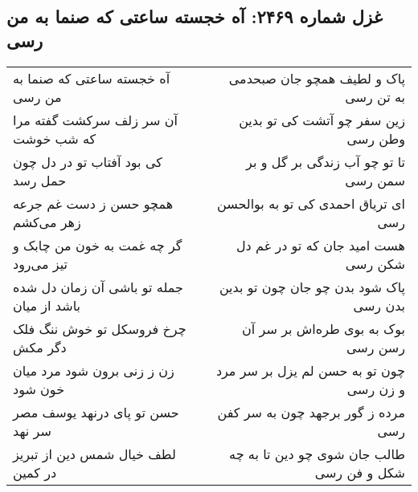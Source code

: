 \begin{center}
\section*{غزل شماره ۲۴۶۹: آه خجسته ساعتی که صنما به من رسی}
\label{sec:2469}
\begin{longtable}{l p{0.5cm} r}
آه خجسته ساعتی که صنما به من رسی
&&
پاک و لطیف همچو جان صبحدمی به تن رسی
\\
آن سر زلف سرکشت گفته مرا که شب خوشت
&&
زین سفر چو آتشت کی تو بدین وطن رسی
\\
کی بود آفتاب تو در دل چون حمل رسد
&&
تا تو چو آب زندگی بر گل و بر سمن رسی
\\
همچو حسن ز دست غم جرعه زهر می‌کشم
&&
ای تریاق احمدی کی تو به بوالحسن رسی
\\
گر چه غمت به خون من چابک و تیز می‌رود
&&
هست امید جان که تو در غم دل شکن رسی
\\
جمله تو باشی آن زمان دل شده باشد از میان
&&
پاک شود بدن چو جان چون تو بدین بدن رسی
\\
چرخ فروسکل تو خوش ننگ فلک دگر مکش
&&
بوک به بوی طره‌اش بر سر آن رسن رسی
\\
زن ز زنی برون شود مرد میان خون شود
&&
چون تو به حسن لم یزل بر سر مرد و زن رسی
\\
حسن تو پای درنهد یوسف مصر سر نهد
&&
مرده ز گور برجهد چون به سر کفن رسی
\\
لطف خیال شمس دین از تبریز در کمین
&&
طالب جان شوی چو دین تا به چه شکل و فن رسی
\\
\end{longtable}
\end{center}
